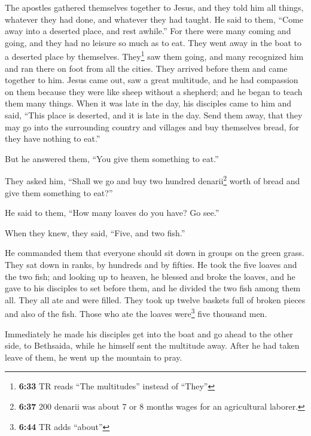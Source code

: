  The apostles gathered themselves together to Jesus, and
they told him all things, whatever they had done, and whatever they had
taught.  He said to them, ``Come away into a deserted
place, and rest awhile.'' For there were many coming and going, and they
had no leisure so much as to eat.  They went away in the
boat to a deserted place by themselves.  They\footnote{\textbf{6:33}
  TR reads ``The multitudes'' instead of ``They''} saw them going, and
many recognized him and ran there on foot from all the cities. They
arrived before them and came together to him.  Jesus came
out, saw a great multitude, and he had compassion on them because they
were like sheep without a shepherd; and he began to teach them many
things.  When it was late in the day, his disciples came
to him and said, ``This place is deserted, and it is late in the day.
 Send them away, that they may go into the surrounding
country and villages and buy themselves bread, for they have nothing to
eat.''

 But he answered them, ``You give them something to
eat.''

They asked him, ``Shall we go and buy two hundred denarii\footnote{\textbf{6:37}
  200 denarii was about 7 or 8 months wages for an agricultural laborer.}
worth of bread and give them something to eat?''

 He said to them, ``How many loaves do you have? Go
see.''

When they knew, they said, ``Five, and two fish.''

 He commanded them that everyone should sit down in
groups on the green grass.  They sat down in ranks, by
hundreds and by fifties.  He took the five loaves and the
two fish; and looking up to heaven, he blessed and broke the loaves, and
he gave to his disciples to set before them, and he divided the two fish
among them all.  They all ate and were filled.
 They took up twelve baskets full of broken pieces and
also of the fish.  Those who ate the loaves
were\footnote{\textbf{6:44} TR adds ``about''} five thousand men.

 Immediately he made his disciples get into the boat and
go ahead to the other side, to Bethsaida, while he himself sent the
multitude away.  After he had taken leave of them, he
went up the mountain to pray.

